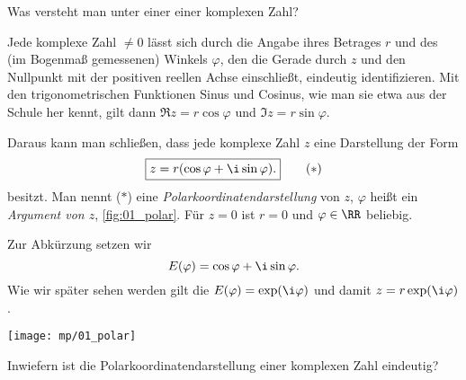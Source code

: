 \begin{frage}\label{polar}
  Was versteht man unter einer  einer komplexen Zahl? 
\end{frage}

\begin{antwort}[]
  \Ant Jede komplexe Zahl $\not=0$ lässt sich durch die Angabe 
  ihres Betrages $r$ und des (im Bogenmaß gemessenen) Winkels  
  $\varphi$, den die Gerade durch $z$ und den Nullpunkt mit der 
  positiven reellen Achse einschließt, eindeutig identifizieren. 
  Mit den trigonometrischen Funktionen Sinus und Cosinus, wie man sie etwa 
  aus der Schule her kennt, gilt dann $\Re z=r\cos \varphi$ 
  und $\Im z=r\sin\varphi$. 

  Daraus kann man schließen, 
  dass jede komplexe Zahl $z$ eine Darstellung der Form 
  \begin{equation*} 
    \boxed{z = r ( \cos \varphi + \i \sin \varphi ).} \tag{$\ast$}
  \end{equation*}
  besitzt. Man nennt ($\ast$) eine 
  \textit{Polarkoordinatendarstellung} von $z$, 
  $\varphi$ heißt ein \textit{Argument von $z$}, 
  \sieheAbbildung\ref{fig:01_polar}. Für $z=0$ ist $r=0$ und $\varphi\in\RR$ beliebig. \AntEnd

  \medskip
  \noindent
  Zur Abkürzung setzen wir 
  \[
  E(\varphi) = \cos\varphi + \i\sin\varphi.
  \]
  Wie wir später sehen werden gilt die  
  $E(\varphi) = \exp(\i\varphi)$ und damit $z=r\exp(\i\varphi)$.
  \begin{center}
    \texttt{[image: mp/01\_polar]}
    \label{fig:01_polar}
  \end{center}
\end{antwort}



\begin{frage}
  Inwiefern ist die Polarkoordinatendarstellung einer 
  komplexen Zahl eindeutig?
\end{frage}

